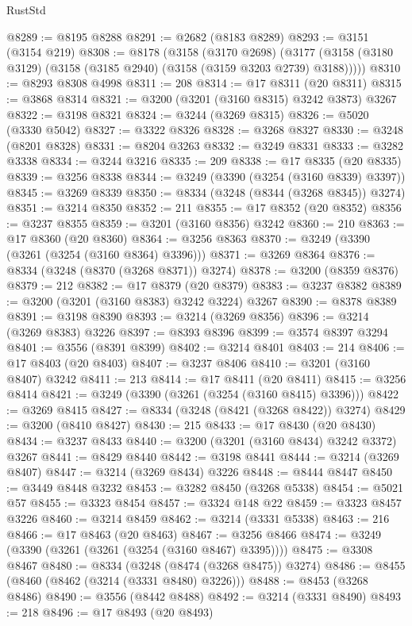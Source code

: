\begin{lexlean}{RustStd}
\begin{coremodule}
@8289 := @8195 @8288
@8291 := @2682 (@8183 @8289)
@8293 := @3151 (@3154 @219)
@8308 := @8178
    (@3158
      (@3170 @2698)
      (@3177 (@3158 (@3180 @3129) (@3158 (@3185 @2940) (@3158 (@3159 @3203 @2739) @3188)))))
@8310 := @8293 @8308 @4998
@8311 := 208
@8314 := @17 @8311 (@20 @8311)
@8315 := @3868 @8314
@8321 := @3200 (@3201 (@3160 @8315) @3242 @3873) @3267
@8322 := @3198 @8321
@8324 := @3244 (@3269 @8315)
@8326 := @5020 (@3330 @5042)
@8327 := @3322 @8326
@8328 := @3268 @8327
@8330 := @3248 (@8201 @8328)
@8331 := @8204 @3263
@8332 := @3249 @8331
@8333 := @3282 @3338
@8334 := @3244 @3216
@8335 := 209
@8338 := @17 @8335 (@20 @8335)
@8339 := @3256 @8338
@8344 := @3249 (@3390 (@3254 (@3160 @8339) @3397))
@8345 := @3269 @8339
@8350 := @8334 (@3248 (@8344 (@3268 @8345)) @3274)
@8351 := @3214 @8350
@8352 := 211
@8355 := @17 @8352 (@20 @8352)
@8356 := @3237 @8355
@8359 := @3201 (@3160 @8356) @3242
@8360 := 210
@8363 := @17 @8360 (@20 @8360)
@8364 := @3256 @8363
@8370 := @3249 (@3390 (@3261 (@3254 (@3160 @8364) @3396)))
@8371 := @3269 @8364
@8376 := @8334 (@3248 (@8370 (@3268 @8371)) @3274)
@8378 := @3200 (@8359 @8376)
@8379 := 212
@8382 := @17 @8379 (@20 @8379)
@8383 := @3237 @8382
@8389 := @3200 (@3201 (@3160 @8383) @3242 @3224) @3267
@8390 := @8378 @8389
@8391 := @3198 @8390
@8393 := @3214 (@3269 @8356)
@8396 := @3214 (@3269 @8383) @3226
@8397 := @8393 @8396
@8399 := @3574 @8397 @3294
@8401 := @3556 (@8391 @8399)
@8402 := @3214 @8401
@8403 := 214
@8406 := @17 @8403 (@20 @8403)
@8407 := @3237 @8406
@8410 := @3201 (@3160 @8407) @3242
@8411 := 213
@8414 := @17 @8411 (@20 @8411)
@8415 := @3256 @8414
@8421 := @3249 (@3390 (@3261 (@3254 (@3160 @8415) @3396)))
@8422 := @3269 @8415
@8427 := @8334 (@3248 (@8421 (@3268 @8422)) @3274)
@8429 := @3200 (@8410 @8427)
@8430 := 215
@8433 := @17 @8430 (@20 @8430)
@8434 := @3237 @8433
@8440 := @3200 (@3201 (@3160 @8434) @3242 @3372) @3267
@8441 := @8429 @8440
@8442 := @3198 @8441
@8444 := @3214 (@3269 @8407)
@8447 := @3214 (@3269 @8434) @3226
@8448 := @8444 @8447
@8450 := @3449 @8448 @3232
@8453 := @3282 @8450 (@3268 @5338)
@8454 := @5021 @57
@8455 := @3323 @8454
@8457 := @3324 @148 @22
@8459 := @3323 @8457 @3226
@8460 := @3214 @8459
@8462 := @3214 (@3331 @5338)
@8463 := 216
@8466 := @17 @8463 (@20 @8463)
@8467 := @3256 @8466
@8474 := @3249 (@3390 (@3261 (@3261 (@3254 (@3160 @8467) @3395))))
@8475 := @3308 @8467
@8480 := @8334 (@3248 (@8474 (@3268 @8475)) @3274)
@8486 := @8455 (@8460 (@8462 (@3214 (@3331 @8480) @3226)))
@8488 := @8453 (@3268 @8486)
@8490 := @3556 (@8442 @8488)
@8492 := @3214 (@3331 @8490)
@8493 := 218
@8496 := @17 @8493 (@20 @8493)

\end{coremodule}
\end{lexlean}
